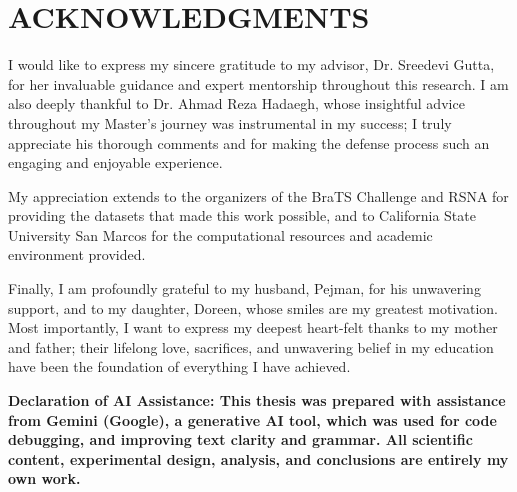 \chapter*{ACKNOWLEDGMENTS}

I would like to express my sincere gratitude to my advisor, Dr. Sreedevi Gutta, for her invaluable guidance and expert mentorship throughout this research. I am also deeply thankful to Dr. Ahmad Reza Hadaegh, whose insightful advice throughout my Master's journey was instrumental in my success; I truly appreciate his thorough comments and for making the defense process such an engaging and enjoyable experience.

My appreciation extends to the organizers of the BraTS Challenge and RSNA for providing the datasets that made this work possible, and to California State University San Marcos for the computational resources and academic environment provided.

Finally, I am profoundly grateful to my husband, Pejman, for his unwavering support, and to my daughter, Doreen, whose smiles are my greatest motivation. Most importantly, I want to express my deepest heart-felt thanks to my mother and father; their lifelong love, sacrifices, and unwavering belief in my education have been the foundation of everything I have achieved.

\vspace{1em}
\textbf{Declaration of AI Assistance: This thesis was prepared with assistance from Gemini (Google), a generative AI tool, which was used for code debugging, and improving text clarity and grammar. All scientific content, experimental design, analysis, and conclusions are entirely my own work.}

